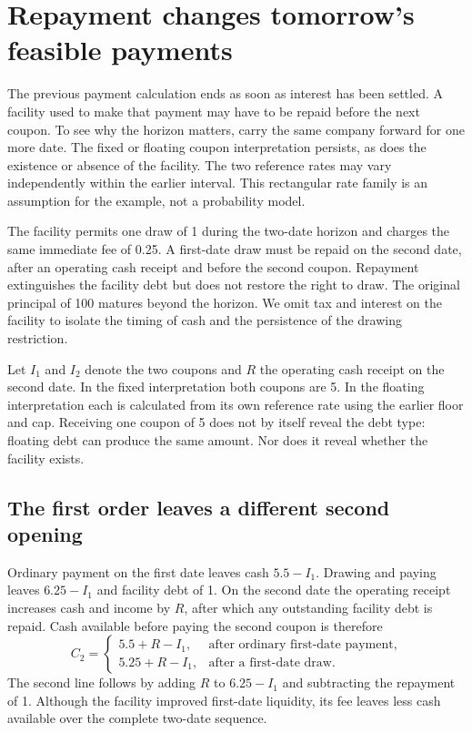 \section{Repayment changes tomorrow's feasible payments}
\label{sim:two-date-continuous-memory}

The previous payment calculation ends as soon as interest has been settled. A facility used to make that payment may have to be repaid before the next coupon. To see why the horizon matters, carry the same company forward for one more date. The fixed or floating coupon interpretation persists, as does the existence or absence of the facility. The two reference rates may vary independently within the earlier interval. This rectangular rate family is an assumption for the example, not a probability model.

The facility permits one draw of 1 during the two-date horizon and charges the same immediate fee of 0.25. A first-date draw must be repaid on the second date, after an operating cash receipt and before the second coupon. Repayment extinguishes the facility debt but does not restore the right to draw. The original principal of 100 matures beyond the horizon. We omit tax and interest on the facility to isolate the timing of cash and the persistence of the drawing restriction.

Let $I_1$ and $I_2$ denote the two coupons and $R$ the operating cash receipt on the second date. In the fixed interpretation both coupons are 5. In the floating interpretation each is calculated from its own reference rate using the earlier floor and cap. Receiving one coupon of 5 does not by itself reveal the debt type: floating debt can produce the same amount. Nor does it reveal whether the facility exists.

\subsection{The first order leaves a different second opening}

Ordinary payment on the first date leaves cash $5.5-I_1$. Drawing and paying leaves $6.25-I_1$ and facility debt of 1. On the second date the operating receipt increases cash and income by $R$, after which any outstanding facility debt is repaid. Cash available before paying the second coupon is therefore
\begin{equation}
 C_2=
 \begin{cases}
  5.5+R-I_1,&\text{after ordinary first-date payment},\\
  5.25+R-I_1,&\text{after a first-date draw}.
 \end{cases}
\end{equation}
The second line follows by adding $R$ to $6.25-I_1$ and subtracting the repayment of 1. Although the facility improved first-date liquidity, its fee leaves less cash available over the complete two-date sequence.

